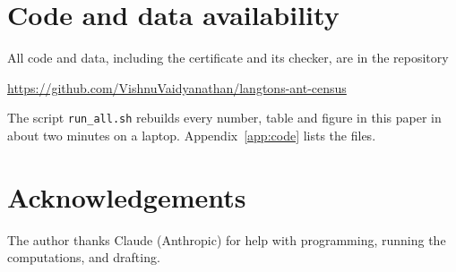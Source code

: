 \documentclass[11pt,a4paper]{article}
\theoremstyle{definition}
\theoremstyle{remark}
\begin{document}
\section*{Code and data availability}

All code and data, including the certificate and its checker, are in the repository
\begin{center}\url{https://github.com/VishnuVaidyanathan/langtons-ant-census}\end{center}
The script \texttt{run\_all.sh} rebuilds every number, table and figure in this paper in about two minutes on a
laptop. Appendix~\ref{app:code} lists the files.

\section*{Acknowledgements}

The author thanks Claude (Anthropic) for help with programming, running the computations, and drafting.
\end{document}
